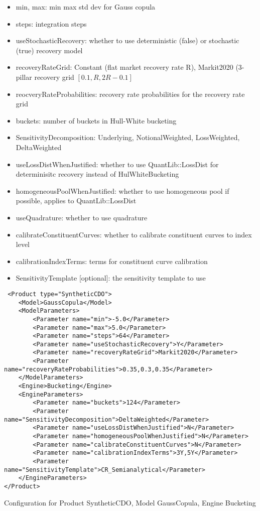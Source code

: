 \begin{itemize}
\item min, max: min max std dev for Gauss copula
\item steps: integration steps
\item useStochasticRecovery: whether to use deterministic (false) or stochastic (true) recovery model
\item recoveryRateGrid: Constant (flat market recovery rate R), Markit2020 (3-pillar recovery grid $[0.1, R, 2R-0.1]$
\item reocveryRateProbabilities: recovery rate probabilities for the recovery rate grid
\item buckets: number of buckets in Hull-White bucketing
\item SensitivityDecomposition: Underlying, NotionalWeighted, LossWeighted, DeltaWeighted
\item useLossDistWhenJustified: whether to use QuantLib::LossDist for determinisitc recovery instead of HulWhiteBucketing
\item homogeneousPoolWhenJustified: whether to use homogeneous pool if possible, applies to QuantLib::LossDist
\item useQuadrature: whether to use quadrature
\item calibrateConstituentCurves: whether to calibrate constituent curves to index level
\item calibrationIndexTerms: terms for constituent curve calibration
\item SensitivityTemplate [optional]: the sensitivity template to use 
\end{itemize}

\begin{longlisting}
\begin{verbatim}
 <Product type="SyntheticCDO">
    <Model>GaussCopula</Model>
    <ModelParameters>
        <Parameter name="min">-5.0</Parameter>
        <Parameter name="max">5.0</Parameter>
        <Parameter name="steps">64</Parameter>
        <Parameter name="useStochasticRecovery">Y</Parameter>
        <Parameter name="recoveryRateGrid">Markit2020</Parameter>
        <Parameter name="recoveryRateProbabilities">0.35,0.3,0.35</Parameter>
    </ModelParameters>
    <Engine>Bucketing</Engine>
    <EngineParameters>
        <Parameter name="buckets">124</Parameter>
        <Parameter name="SensitivityDecomposition">DeltaWeighted</Parameter>
        <Parameter name="useLossDistWhenJustified">N</Parameter>
        <Parameter name="homogeneousPoolWhenJustified">N</Parameter>
        <Parameter name="calibrateConstituentCurves">N</Parameter>
        <Parameter name="calibrationIndexTerms">3Y,5Y</Parameter>
        <Parameter name="SensitivityTemplate">CR_Semianalytical</Parameter>
    </EngineParameters>
</Product>
\end{verbatim}
\caption{Configuration for Product SyntheticCDO, Model GaussCopula, Engine Bucketing}
\label{lst:peconfig_SyntheticCDO_GaussCopula_Bucketing}
\end{longlisting}

